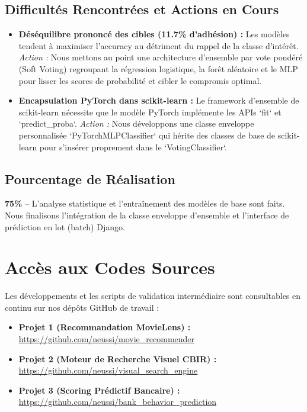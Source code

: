 \documentclass[12pt,a4paper]{article}
\begin{document}
\subsection{Difficultés Rencontrées et Actions en Cours}
\begin{itemize}
    \item \textbf{Déséquilibre prononcé des cibles (11.7\% d'adhésion) :} Les modèles tendent à maximiser l'accuracy au détriment du rappel de la classe d'intérêt.
    \textit{Action :} Nous mettons au point une architecture d'ensemble par vote pondéré (Soft Voting) regroupant la régression logistique, la forêt aléatoire et le MLP pour lisser les scores de probabilité et cibler le compromis optimal.
    \item \textbf{Encapsulation PyTorch dans scikit-learn :} Le framework d'ensemble de scikit-learn nécessite que le modèle PyTorch implémente les APIs `fit` et `predict\_proba`.
    \textit{Action :} Nous développons une classe enveloppe personnalisée `PyTorchMLPClassifier` qui hérite des classes de base de scikit-learn pour s'insérer proprement dans le `VotingClassifier`.
\end{itemize}

\subsection{Pourcentage de Réalisation}
\textbf{75\%} -- L'analyse statistique et l'entraînement des modèles de base sont faits. Nous finalisons l'intégration de la classe enveloppe d'ensemble et l'interface de prédiction en lot (batch) Django.

\newpage

\section{Accès aux Codes Sources}

Les développements et les scripts de validation intermédiaire sont consultables en continu sur nos dépôts GitHub de travail :
\begin{itemize}
    \item \textbf{Projet 1 (Recommandation MovieLens) :} \url{https://github.com/neussi/movie_recommender}
    \item \textbf{Projet 2 (Moteur de Recherche Visuel CBIR) :} \url{https://github.com/neussi/visual_search_engine}
    \item \textbf{Projet 3 (Scoring Prédictif Bancaire) :} \url{https://github.com/neussi/bank_behavior_prediction}
\end{itemize}
\end{document}

